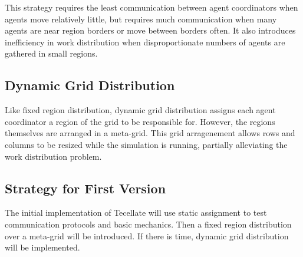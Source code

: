 This strategy requires the least communication between agent coordinators when agents move relatively little, but requires much communication when many agents are near region borders or move between borders often. It also introduces inefficiency in work distribution when disproportionate numbers of agents are gathered in small regions.

\subsection{Dynamic Grid Distribution}

Like fixed region distribution, dynamic grid distribution assigns each agent coordinator a region of the grid to be responsible for. However, the regions themselves are arranged in a meta-grid. This grid arragenement allows rows and columns to be resized while the simulation is running, partially alleviating the work distribution problem.

\subsection{Strategy for First Version}

The initial implementation of Tecellate will use static assignment to test communication protocols and basic mechanics. Then a fixed region distribution over a meta-grid will be introduced. If there is time, dynamic grid distribution will be implemented.